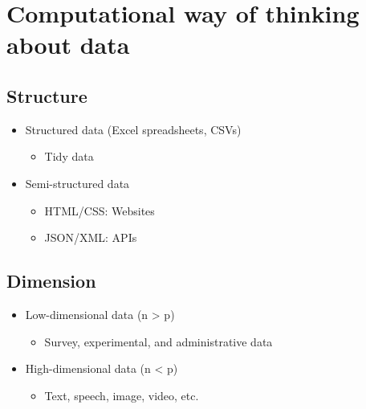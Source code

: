 \documentclass[
]{book}
\providecommand{\tightlist}{%
  \setlength{\itemsep}{0pt}\setlength{\parskip}{0pt}}
\begin{document}
\hypertarget{computational-way-of-thinking-about-data}{%
\section{Computational way of thinking about data}\label{computational-way-of-thinking-about-data}}

\hypertarget{structure}{%
\subsection{Structure}\label{structure}}

\begin{itemize}
\tightlist
\item
  Structured data (Excel spreadsheets, CSVs)

  \begin{itemize}
  \tightlist
  \item
    Tidy data
  \end{itemize}
\item
  Semi-structured data

  \begin{itemize}
  \tightlist
  \item
    HTML/CSS: Websites
  \item
    JSON/XML: APIs
  \end{itemize}
\end{itemize}

\hypertarget{dimension}{%
\subsection{Dimension}\label{dimension}}

\begin{itemize}
\tightlist
\item
  Low-dimensional data (n \textgreater{} p)

  \begin{itemize}
  \tightlist
  \item
    Survey, experimental, and administrative data
  \end{itemize}
\item
  High-dimensional data (n \textless{} p)

  \begin{itemize}
  \tightlist
  \item
    Text, speech, image, video, etc.
  \end{itemize}
\end{itemize}
\end{document}

